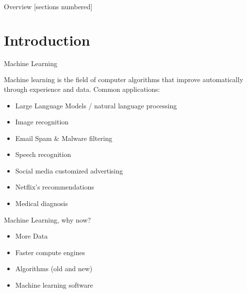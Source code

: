 \titleframe

\begin{frame}{Overview}
  [sections numbered]
  \tableofcontents[hideallsubsections]
\end{frame}


%
%
%
%

\section[Introduction and Categories \\ of \\ Machine Learning problems]{Introduction}
\begin{frame}{Machine Learning}
  
  Machine learning is the field of computer algorithms that improve automatically through experience and data.
  Common applications:
      \begin{itemize}
        \item Large Language Models / natural language processing
        \item Image recognition
        \item Email Spam \& Malware filtering
        \item Speech recognition
        \item Social media customized advertising
        \item Netflix's recommendations
        \item Medical diagnosis
      \end{itemize}
\end{frame}

\begin{frame}{Machine Learning, why now?}
      \begin{itemize}
        \item More Data
        \item Faster compute engines
        \item Algorithms (old and new)
        \item Machine learning software
      \end{itemize}
  
\end{frame}


